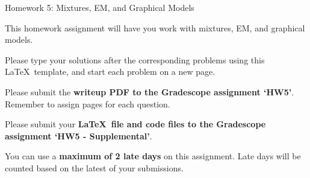 \documentclass[submit]{harvardml}
\begin{document}
\begin{center}
{\Large Homework 5: Mixtures, EM, and Graphical Models}\\
\end{center}

This homework assignment will have you work with mixtures, EM, and
graphical models.  

Please type your solutions after the corresponding problems using this
\LaTeX\ template, and start each problem on a new page.

Please submit the \textbf{writeup PDF to the Gradescope assignment `HW5'}. Remember to assign pages for each question.

Please submit your \textbf{\LaTeX\ file and code files to the Gradescope assignment `HW5 - Supplemental'}. 

You can use a \textbf{maximum of 2 late days} on this assignment.  Late days will be counted based on the latest of your submissions. 
\\
\end{document}

